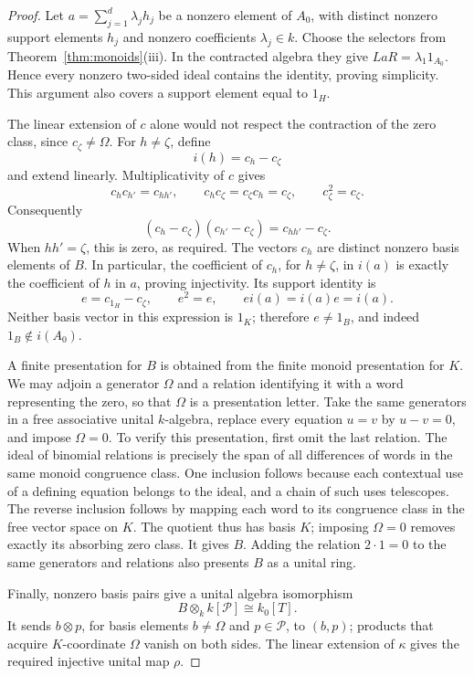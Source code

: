 \begin{proof}
Let \(a=\sum_{j=1}^d\lambda_jh_j\) be a nonzero element of \(A_0\),
with distinct nonzero support elements \(h_j\) and nonzero coefficients
\(\lambda_j\in k\).  Choose the selectors from
Theorem~\ref{thm:monoids}(iii).  In the contracted algebra they give
\(LaR=\lambda_1 1_{A_0}\).  Hence every nonzero two-sided ideal contains
the identity, proving simplicity.  This argument also covers a support
element equal to \(1_H\).

The linear extension of \(c\) alone would not respect the contraction
of the zero class, since \(c_{\zeta}\ne\Omega\). For \(h\ne\zeta\), define
\[
 i(h)=c_h-c_{\zeta}
\]
and extend linearly.  Multiplicativity of \(c\) gives
\[
 c_hc_{h'}=c_{hh'},\qquad
 c_hc_{\zeta}=c_{\zeta}c_h=c_{\zeta},\qquad
 c_{\zeta}^2=c_{\zeta}.
\]
Consequently
\[
 (c_h-c_{\zeta})(c_{h'}-c_{\zeta})=c_{hh'}-c_{\zeta}.
\]
When \(hh'=\zeta\), this is zero, as required.  The vectors \(c_h\)
are distinct nonzero basis elements of \(B\).  In particular, the
coefficient of \(c_h\), for \(h\ne\zeta\), in \(i(a)\) is exactly
the coefficient of \(h\) in \(a\), proving injectivity.  Its support
identity is
\[
 e=c_{1_H}-c_{\zeta},\qquad e^2=e,
 \qquad ei(a)=i(a)e=i(a).
\]
Neither basis vector in this expression is \(1_K\); therefore
\(e\ne1_B\), and indeed \(1_B\notin i(A_0)\).

A finite presentation for \(B\) is obtained from the finite monoid
presentation for \(K\).  We may adjoin a generator \(\Omega\) and a
relation identifying it with a word representing the zero, so that
\(\Omega\) is a presentation letter.  Take the same generators in a free associative
unital \(k\)-algebra, replace every equation \(u=v\) by \(u-v=0\),
and impose \(\Omega=0\).  To verify this presentation, first omit the
last relation.  The ideal of binomial relations is precisely the span
of all differences of words in the same monoid congruence class.
One inclusion follows because each contextual use of a defining
equation belongs to the ideal, and a chain of such uses telescopes.
The reverse inclusion follows by mapping each word to its congruence
class in the free vector space on \(K\).  The quotient thus has basis
\(K\); imposing \(\Omega=0\) removes exactly its absorbing zero
class.  It gives \(B\).  Adding the relation \(2\cdot1=0\) to the same
generators and relations also presents \(B\) as a unital ring.

Finally, nonzero basis pairs give a unital algebra isomorphism
\[
 B\otimes_k k[\mathcal P]\cong k_0[T].
\]
It sends \(b\otimes p\), for basis elements \(b\ne\Omega\) and
\(p\in\mathcal P\), to \((b,p)\); products that acquire
\(K\)-coordinate \(\Omega\) vanish on both sides. The linear extension
of \(\kappa\) gives the required injective unital map \(\rho\).
\end{proof}

